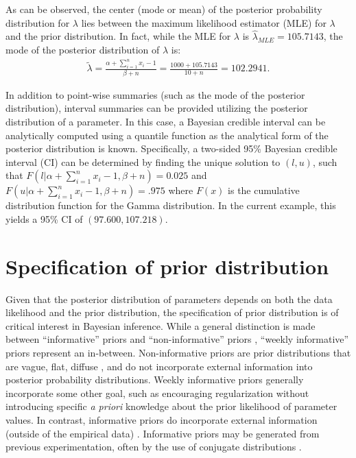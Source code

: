 \begin{DoubleSpace*}
As can be observed, the center (mode or mean) of the posterior probability distribution for $\lambda$ lies between the maximum likelihood estimator (MLE) for $\lambda$ and the prior distribution. In fact, while the MLE for $\lambda$ is $\hat{\lambda}_{MLE}=105.7143$, the mode of the posterior distribution of $\lambda$ is:
\begin{align*}
	\tilde{\lambda} = \frac{\alpha+ \sum_{i=1}^n x_i -1}{\beta+n} =\frac{1000+105.7143}{10+n} = 102.2941.
\end{align*}

In addition to point-wise summaries (such as the mode of the posterior distribution), interval summaries can be provided utilizing the posterior distribution of a parameter. In this case, a Bayesian credible interval \cite{gelman2004} can be analytically computed using a quantile function as the analytical form of the posterior distribution is known. Specifically, a two-sided 95\% Bayesian credible interval (CI) can be determined by finding the unique solution to $(l,u)$, such that $F(l|\alpha+ \sum_{i=1}^n x_i -1,\beta+n)=0.025$ and $F(u|\alpha+ \sum_{i=1}^n x_i -1,\beta+n)=.975$ where $F(x)$ is the cumulative distribution function for the Gamma distribution. In the current example, this yields a 95\% CI of $(97.600, 107.218)$.
 
\section{Specification of prior distribution}
Given that the posterior distribution of parameters depends on both the data likelihood and the prior distribution, the specification of prior distribution is of critical interest in Bayesian inference. While a general distinction is made between ``informative'' priors and ``non-informative'' priors \cite{gelman2006}, ``weekly informative'' priors represent an in-between. Non-informative priors are prior distributions that are vague, flat, diffuse \cite{gelman2004}, and do not incorporate external information into posterior probability distributions. Weekly informative priors generally incorporate some other goal, such as encouraging regularization without introducing specific \emph{a priori} knowledge about the prior likelihood of parameter values. In contrast, informative priors do incorporate external information (outside of the empirical data) \cite{gelman2004}. Informative priors may be generated from previous experimentation, often by the use of conjugate distributions \cite{hoff2009}. 


\end{DoubleSpace*}
